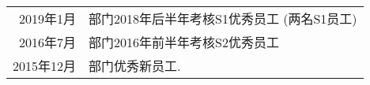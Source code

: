 %
%




\begin{tabular}{rl}	
	2019年1月 & 部门2018年后半年考核S1优秀员工  (两名S1员工) \\
    2016年7月 & 部门2016年前半年考核S2优秀员工 \\
	2015年12月 & 部门优秀新员工.	
\end{tabular}

